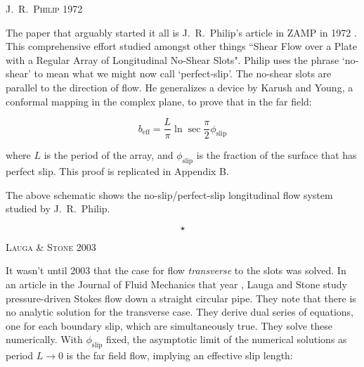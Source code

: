 \documentclass[a4paper]{report}
\newcommand{\beff}{\ensuremath{b_{\mathrm{eff}}}}
\newcommand{\phislip}{\ensuremath{\phi_{\mathrm{slip}}}}
\newcommand{\sep}{\begin{equation*} \star \end{equation*}}
\newcommand{\paper}[1]
         {\colorbox[gray]{0.8}{ \textsc{#1}}
         
         }
\begin{document}
\paper{J.\ R.\ Philip 1972}
The paper that arguably started it all is J.\ R.\ Philip's article in ZAMP in 1972 \cite{Philip1972}.  This comprehensive effort studied amongst other things ``Shear Flow over a Plate with a Regular Array of Longitudinal No-Shear Slots".  Philip uses the phrase `no-shear' to mean what we might now call `perfect-slip'.  The no-shear slots are parallel to the direction of flow.   He generalizes a device by Karush and Young, a conformal mapping in the complex plane, to prove that in the far field:

\[ \beff= \frac{L}{\pi}	\ln \sec \frac{\pi}{2} \phislip \]

where $L$ is the period of the array, and $\phislip$ is the fraction of the surface that has perfect slip. This proof is replicated in Appendix B. 

\begin{center}
\end{center}
The above schematic shows the no-slip/perfect-slip longitudinal flow system studied by J.\ R.\ Philip.

\sep

\paper{Lauga \& Stone 2003}
It wasn't until 2003 that the case for flow \emph{transverse} to the slots was solved.  
In an article in the Journal of Fluid Mechanics that year \cite{LaugaStone2003}, Lauga and Stone study pressure-driven Stokes flow down a straight circular pipe.  They note that there is no analytic solution for the transverse case.  They derive dual series of equations, one for each boundary slip, which are simultaneously true.  They solve these numerically.  With $\phislip$ fixed, the asymptotic limit of the numerical solutions as period $L \rightarrow 0$ is the far field flow, implying an effective slip length:
\end{document}
